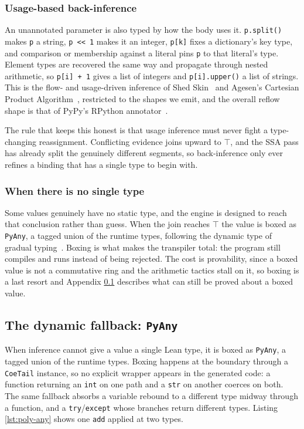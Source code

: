 \documentclass{article}
\newcommand{\code}{\lstinline}
\begin{document}
\subsubsection{Usage-based back-inference}

An unannotated parameter is also typed by how the body uses it. \code{p.split()} makes \code{p} a string, \code{p << 1} makes it an integer, \code{p[k]} fixes a dictionary's key type, and comparison or membership against a literal pins \code{p} to that literal's type. Element types are recovered the same way and propagate through nested arithmetic, so \code{p[i] + 1} gives a list of integers and \code{p[i].upper()} a list of strings. This is the flow- and usage-driven inference of Shed Skin~\cite{dufour2006shedskin} and Agesen's Cartesian Product Algorithm~\cite{agesen1995cpa,salib2004starkiller}, restricted to the shapes we emit, and the overall reflow shape is that of PyPy's RPython annotator~\cite{rigo2006pypy,palsberg1991oot}.

The rule that keeps this honest is that usage inference must never fight a type-changing reassignment. Conflicting evidence joins upward to $\top$, and the SSA pass has already split the genuinely different segments, so back-inference only ever refines a binding that has a single type to begin with.

\subsubsection{When there is no single type}\label{sec:pyany}

Some values genuinely have no static type, and the engine is designed to reach that conclusion rather than guess. When the join reaches $\top$ the value is boxed as \code{PyAny}, a tagged union of the runtime types, following the dynamic type of gradual typing~\cite{siek2006gradual}. Boxing is what makes the transpiler total: the program still compiles and runs instead of being rejected. The cost is provability, since a boxed value is not a commutative ring and the arithmetic tactics stall on it, so boxing is a last resort and Appendix \ref{app:pyany} describes what can still be proved about a boxed value.


\subsection{The dynamic fallback: \code{PyAny}}\label{app:pyany}

When inference cannot give a value a single Lean type, it is boxed as \code{PyAny}, a tagged union of the runtime types. Boxing happens at the boundary through a \code{CoeTail} instance, so no explicit wrapper appears in the generated code: a function returning an \code{int} on one path and a \code{str} on another coerces on both. The same fallback absorbs a variable rebound to a different type midway through a function, and a \code{try}/\code{except} whose branches return different types. Listing \ref{lst:poly-any} shows one \code{add} applied at two types.
\end{document}
